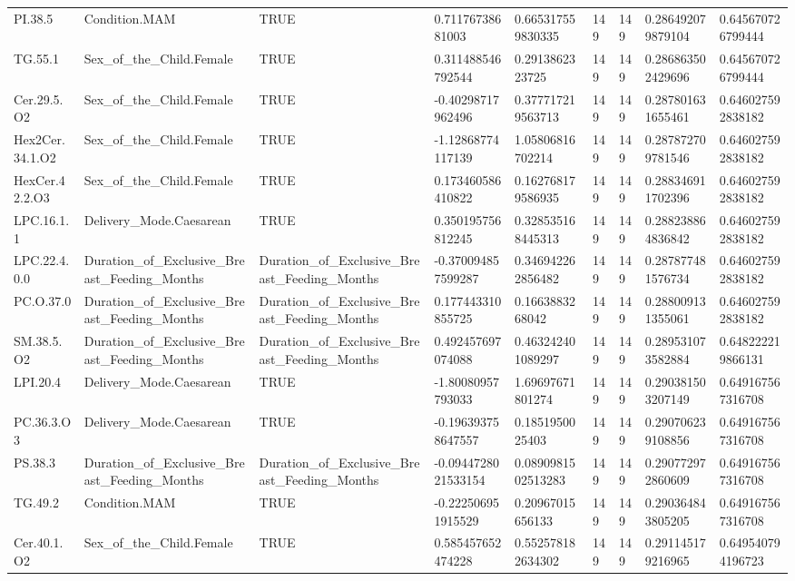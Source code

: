 \begin{longtable}{lllllllll}
PI.38.5 & Condition.MAM & TRUE & 0.71176738681003 & 0.665317559830335 & 149 & 149 & 0.286492079879104 & 0.645670726799444 \\
TG.55.1 & Sex\_of\_the\_Child.Female & TRUE & 0.311488546792544 & 0.2913862323725 & 149 & 149 & 0.286863502429696 & 0.645670726799444 \\
Cer.29.5.O2 & Sex\_of\_the\_Child.Female & TRUE & -0.40298717962496 & 0.377717219563713 & 149 & 149 & 0.287801631655461 & 0.646027592838182 \\
Hex2Cer.34.1.O2 & Sex\_of\_the\_Child.Female & TRUE & -1.12868774117139 & 1.05806816702214 & 149 & 149 & 0.287872709781546 & 0.646027592838182 \\
HexCer.42.2.O3 & Sex\_of\_the\_Child.Female & TRUE & 0.173460586410822 & 0.162768179586935 & 149 & 149 & 0.288346911702396 & 0.646027592838182 \\
LPC.16.1.1 & Delivery\_Mode.Caesarean & TRUE & 0.350195756812245 & 0.328535168445313 & 149 & 149 & 0.288238864836842 & 0.646027592838182 \\
LPC.22.4.0.0 & Duration\_of\_Exclusive\_Breast\_Feeding\_Months & Duration\_of\_Exclusive\_Breast\_Feeding\_Months & -0.370094857599287 & 0.346942262856482 & 149 & 149 & 0.287877481576734 & 0.646027592838182 \\
PC.O.37.0 & Duration\_of\_Exclusive\_Breast\_Feeding\_Months & Duration\_of\_Exclusive\_Breast\_Feeding\_Months & 0.177443310855725 & 0.1663883268042 & 149 & 149 & 0.288009131355061 & 0.646027592838182 \\
SM.38.5.O2 & Duration\_of\_Exclusive\_Breast\_Feeding\_Months & Duration\_of\_Exclusive\_Breast\_Feeding\_Months & 0.492457697074088 & 0.463242401089297 & 149 & 149 & 0.289531073582884 & 0.648222219866131 \\
LPI.20.4 & Delivery\_Mode.Caesarean & TRUE & -1.80080957793033 & 1.69697671801274 & 149 & 149 & 0.290381503207149 & 0.649167567316708 \\
PC.36.3.O3 & Delivery\_Mode.Caesarean & TRUE & -0.196393758647557 & 0.1851950025403 & 149 & 149 & 0.290706239108856 & 0.649167567316708 \\
PS.38.3 & Duration\_of\_Exclusive\_Breast\_Feeding\_Months & Duration\_of\_Exclusive\_Breast\_Feeding\_Months & -0.0944728021533154 & 0.0890981502513283 & 149 & 149 & 0.290772972860609 & 0.649167567316708 \\
TG.49.2 & Condition.MAM & TRUE & -0.222506951915529 & 0.20967015656133 & 149 & 149 & 0.290364843805205 & 0.649167567316708 \\
Cer.40.1.O2 & Sex\_of\_the\_Child.Female & TRUE & 0.585457652474228 & 0.552578182634302 & 149 & 149 & 0.291145179216965 & 0.649540794196723 \\

\end{longtable}
